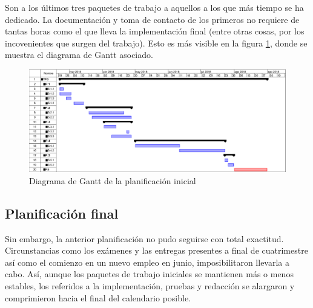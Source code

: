 Son a los últimos tres paquetes de trabajo a aquellos a los que más tiempo se ha dedicado. La documentación y toma de contacto de los primeros no requiere de tantas horas como el que lleva la implementación final (entre otras cosas, por los incovenientes que surgen del trabajo). Esto es más visible en la figura \ref{fig:gant1}, donde se muestra el diagrama de Gantt asociado.

\begin{figure}[H]
  \centering
  \includegraphics[scale=0.45]{imagenes/gant1}
  \caption{Diagrama de Gantt de la planificación inicial}
  \label{fig:gant1}
\end{figure}

\subsection{Planificación final}
Sin embargo, la anterior planificación no pudo seguirse con total exactitud. Circunstancias como los exámenes y las entregas presentes a final de cuatrimestre así como el comienzo en un nuevo empleo en junio, imposibilitaron llevarla a cabo. Así, aunque los paquetes de trabajo iniciales se mantienen más o menos estables, los referidos a la implementación, pruebas y redacción se alargaron y comprimieron hacia el final del calendario posible.

